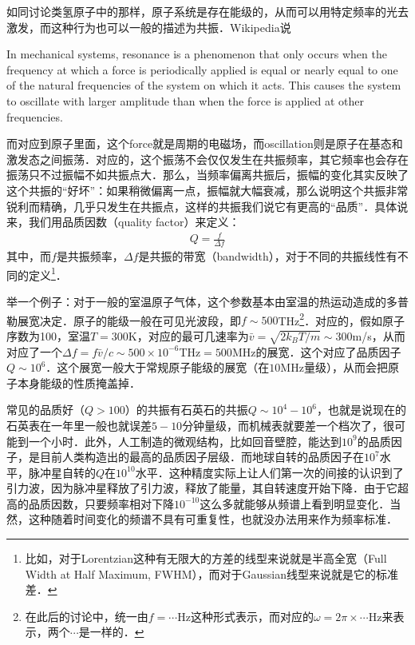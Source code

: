 


如同讨论类氢原子中的那样，原子系统是存在能级的，从而可以用特定频率的光去激发，而这种行为也可以一般的描述为共振．Wikipedia说

In mechanical systems, resonance is a phenomenon that only occurs when the frequency at which a force is periodically applied is equal or nearly equal to one of the natural frequencies of the system on which it acts. This causes the system to oscillate with larger amplitude than when the force is applied at other frequencies.

而对应到原子里面，这个force就是周期的电磁场，而oscillation则是原子在基态和激发态之间振荡．对应的，这个振荡不会仅仅发生在共振频率，其它频率也会存在振荡只不过振幅不如共振点大．那么，当频率偏离共振后，振幅的变化其实反映了这个共振的“好坏”：如果稍微偏离一点，振幅就大幅衰减，那么说明这个共振非常锐利而精确，几乎只发生在共振点，这样的共振我们说它有更高的“品质”．具体说来，我们用品质因数（quality factor）来定义：
\begin{align}
Q = \frac{f}{\Delta f}
\end{align}
其中，而$f$是共振频率，$\Delta f$是共振的带宽（bandwidth），对于不同的共振线性有不同的定义\footnote{比如，对于Lorentzian这种有无限大的方差的线型来说就是半高全宽（Full Width at Half Maximum, FWHM），而对于Gaussian线型来说就是它的标准差．}．

举一个例子：对于一般的室温原子气体，这个参数基本由室温的热运动造成的多普勒展宽决定．原子的能级一般在可见光波段，即$f\sim 500$THz\footnote{在此后的讨论中，统一由$f=\cdots$Hz这种形式表示，而对应的$\omega=2\pi\times\cdots$Hz来表示，两个$\cdots$是一样的．}．对应的，假如原子序数为100，室温$T=300$K，对应的最可几速率为$\bar{v}=\sqrt{2k_BT/m}\sim300$m/s，从而对应了一个$\Delta f=f\bar{v}/c\sim500\times10^{-6}$THz$=500$MHz的展宽．这个对应了品质因子$Q\sim10^6$．这个展宽一般大于常规原子能级的展宽（在$10$MHz量级），从而会把原子本身能级的性质掩盖掉．

常见的品质好（$Q>100$）的共振有石英石的共振$Q\sim10^4-10^6$，也就是说现在的石英表在一年里一般也就误差$5-10$分钟量级，而机械表就要差一个档次了，很可能到一个小时．此外，人工制造的微观结构，比如回音壁腔，能达到$10^9$的品质因子，是目前人类构造出的最高的品质因子层级．而地球自转的品质因子在$10^7$水平，脉冲星自转的$Q$在$10^{10}$水平．这种精度实际上让人们第一次的间接的认识到了引力波，因为脉冲星释放了引力波，释放了能量，其自转速度开始下降．由于它超高的品质因数，只要频率相对下降$10^{-10}$这么多就能够从频谱上看到明显变化．当然，这种随着时间变化的频谱不具有可重复性，也就没办法用来作为频率标准．

